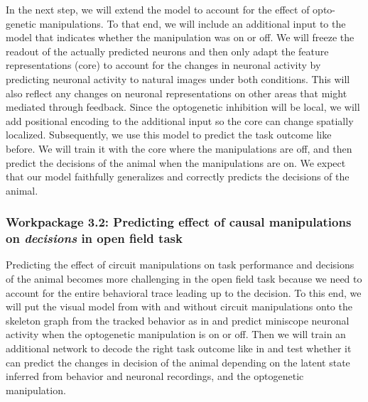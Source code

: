 \documentclass[B2,COG]{ercgrant}
\begin{document}
In the next step, we will extend the model to account for the effect of opto-genetic manipulations. 
To that end, we will include an additional input to the model that indicates whether the manipulation was on or off. 
We will freeze the readout of the actually predicted neurons and then only adapt the feature representations (core) to account for the changes in neuronal activity by predicting neuronal activity to natural images under both conditions.
This will also reflect any changes on neuronal representations on other areas that might mediated through feedback. 
Since the optogenetic inhibition will be local, we will add positional encoding to the additional input so the core can change spatially localized. 
Subsequently, we use this model to predict the task outcome like before.
We will train it with the core where the manipulations are off, and then predict the decisions of the animal when the manipulations are on.
We expect that our model faithfully generalizes and correctly predicts the decisions of the animal. 

\subsubsection{Workpackage 3.2: Predicting effect of causal manipulations on \textit{decisions} in open field task\hfill{}}
Predicting the effect of circuit manipulations on task performance and decisions of the animal becomes more challenging in the open field task because we need to account for the entire behavioral trace leading up to the decision. 
To this end, we will put the visual model from  with and without circuit manipulations onto the skeleton graph from the tracked behavior as in  and predict miniscope neuronal activity when the optogenetic manipulation is on or off. 
Then we will train an additional network to decode the right task outcome like in  and test whether it can predict the changes in decision of the animal depending on the latent state inferred from behavior and neuronal recordings, and the optogenetic manipulation. 
\end{document}
